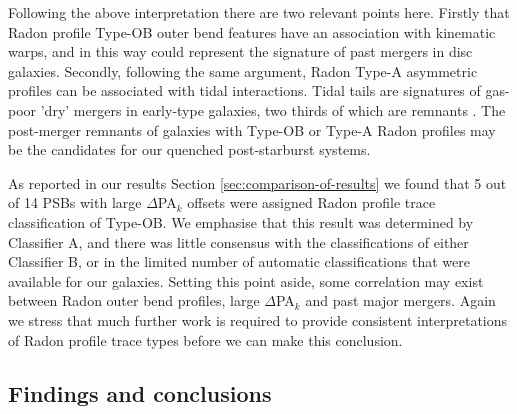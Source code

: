 Following the above interpretation there are two relevant points here. Firstly that Radon profile Type-OB outer bend features have an association with kinematic warps, and in this way could represent the signature of past mergers in disc galaxies. Secondly, following the same argument, Radon Type-A asymmetric profiles can be associated with tidal interactions. Tidal tails are signatures of gas-poor 'dry' mergers in early-type galaxies, two thirds of which are remnants \citep{2005AJ....130.2647V}. The post-merger remnants of galaxies with Type-OB or Type-A Radon profiles may be the candidates for our quenched post-starburst systems.

As reported in our results Section \ref{sec:comparison-of-results} we found that 5 out of 14 PSBs with large $\Delta$PA$_{k}$ offsets were assigned Radon profile trace classification of Type-OB. We emphasise that this result was determined by Classifier A, and there was little consensus with the classifications of either Classifier B, or in the limited number of automatic classifications that were available for our galaxies. Setting this point aside, some correlation may exist between Radon outer bend profiles, large $\Delta$PA$_{k}$ and past major mergers. Again we stress that much further work is required to provide consistent interpretations of Radon profile trace types before we can make this conclusion.

\subsection{Findings and conclusions}
\label{findings}

